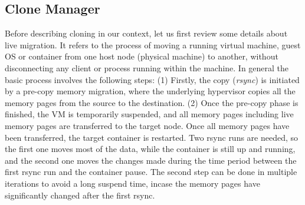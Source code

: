 \subsection{Clone Manager} 
\label{sec:CloneManager}



Before describing cloning in our context, let us first review some details about live migration. 
It refers to the process of moving a running virtual machine, guest OS or container from one host node (physical machine) to another, without disconnecting any client or process running within the machine. 
In general the basic process involves the following steps: 
(1) Firstly, the copy (\textit{rsync}) is initiated by a pre-copy memory migration, where the underlying hypervisor copies all the memory pages from the source to the destination. 
(2) Once the pre-copy phase is finished, the VM is temporarily suspended, and all memory pages including live memory pages are transferred to the target node. 
Once all memory pages have been transferred, the target container is restarted. 
Two rsync runs are needed, so the first one moves most of the data, while the container is still up and running, and the second one moves the changes made during the time period between the first rsync run and the container pause.
The second step can be done in multiple iterations to avoid a long suspend time, incase the memory pages have significantly changed after the first rsync. 

